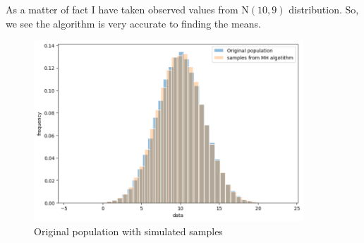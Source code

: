 \begin{example}
    As a matter of fact I have taken observed values from $ \text{N}(10,9) $ distribution. So, we see the algorithm is very accurate to finding the means.

    \begin{figure}[H]
        \centering
        \includegraphics[width=0.9\textwidth]{images/metropolis/example2-original-with-simulated.png}
        \caption{Original population with simulated samples}
    \end{figure}

\end{example}







